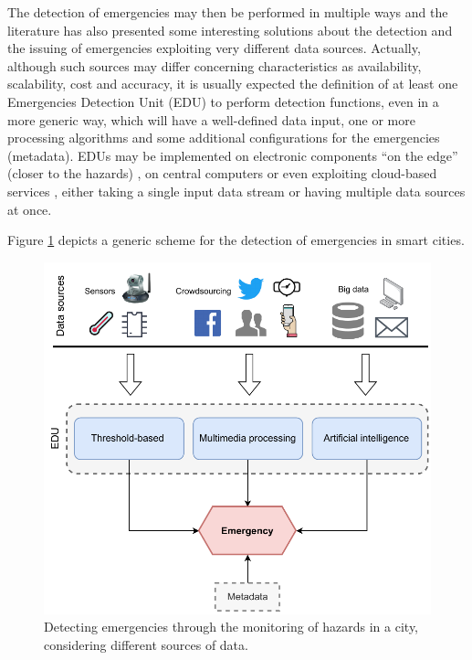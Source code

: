\begin{refsection}
The detection of emergencies may then be performed in multiple ways and the literature has also presented some interesting solutions about the detection and the issuing of emergencies exploiting very different data sources. Actually, although such sources may differ concerning characteristics as availability, scalability, cost and accuracy, it is usually expected the definition of at least one Emergencies Detection Unit (EDU) to perform detection functions, even in a more generic way, which will have a well-defined data input, one or more processing algorithms and some additional configurations for the emergencies (metadata). EDUs may be implemented on electronic components ``on the edge'' (closer to the hazards) \cite{PlatformsSC,sensorsplatforms}, on central computers \cite{twitterDetection2,centralserver1} or even exploiting cloud-based services \cite{cloud1}, either taking a single input data stream or having multiple data sources at once. 

Figure \ref{Fig:detection} depicts a generic scheme for the detection of emergencies in smart cities. 

\begin{figure}[ht]
  \centering
  \includegraphics[scale=0.6]{Chapters/1-Survey/images/detection.pdf}
  \caption{Detecting emergencies through the monitoring of hazards in a city, considering different sources of data.}\label{Fig:detection}
\end{figure}


\end{refsection}
